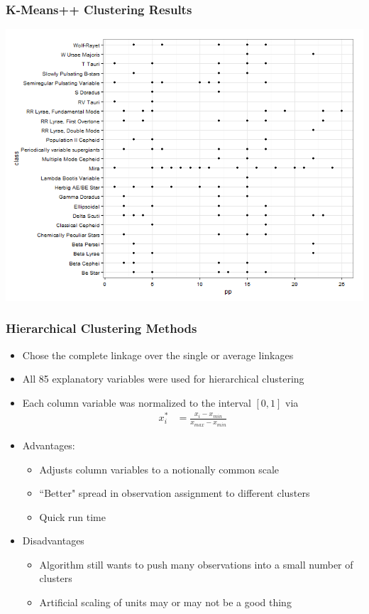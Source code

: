 \documentclass{beamer}
\begin{document}

\begin{frame}
\frametitle{K-Means++ Clustering Results}
\begin{center}
\includegraphics[scale=.4]{pp.png}
\end{center}
\end{frame}


\begin{frame}
	\frametitle{Hierarchical Clustering Methods}
		\begin{itemize}
			\item Chose the complete linkage over the single or average linkages
			\item All 85 explanatory variables were used for hierarchical clustering
			\item Each column variable was normalized to the interval $[0,1]$ via
				\begin{align*}
					x_i^{*} &= \frac{x_i-x_{min}}{x_{max}-x_{min}}
				\end{align*}
			\item Advantages:
			\begin{itemize}
				\item Adjusts column variables to a notionally common scale
				\item ``Better" spread in observation assignment to different clusters
				\item Quick run time
			\end{itemize}
			\item Disadvantages
			\begin{itemize}
				\item Algorithm still wants to push many observations into a small number of clusters
				\item Artificial scaling of units may or may not be a good thing
			\end{itemize}
		\end{itemize}
\end{frame}
\end{document}
